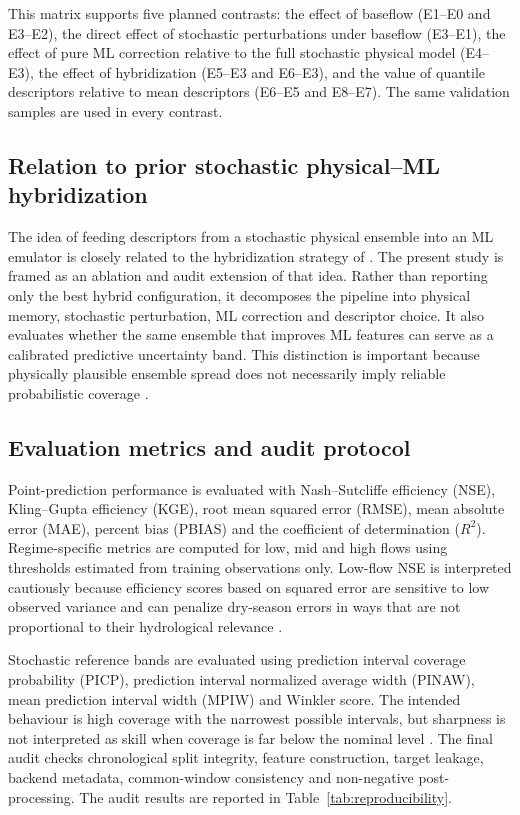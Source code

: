 This matrix supports five planned contrasts: the effect of baseflow
(E1--E0 and E3--E2), the direct effect of stochastic perturbations under
baseflow (E3--E1), the effect of pure ML correction relative to the full
stochastic physical model (E4--E3), the effect of hybridization
(E5--E3 and E6--E3), and the value of quantile descriptors relative to
mean descriptors (E6--E5 and E8--E7). The same validation samples are
used in every contrast.

\subsection{Relation to prior stochastic physical--ML hybridization}
\label{subsec:relation}

The idea of feeding descriptors from a stochastic physical ensemble into
an ML emulator is closely related to the hybridization strategy of
\citet{houenafa2025hybridization}. The present study is framed as an
ablation and audit extension of that idea. Rather than reporting only
the best hybrid configuration, it decomposes the pipeline into physical
memory, stochastic perturbation, ML correction and descriptor choice. It
also evaluates whether the same ensemble that improves ML features can
serve as a calibrated predictive uncertainty band. This distinction is
important because physically plausible ensemble spread does not
necessarily imply reliable probabilistic coverage
\citep{atger1999skill,franz2011evaluating,papacharalampous2022review}.

\subsection{Evaluation metrics and audit protocol}\label{subsec:evaluation}

Point-prediction performance is evaluated with Nash--Sutcliffe
efficiency (NSE), Kling--Gupta efficiency (KGE), root mean squared error
(RMSE), mean absolute error (MAE), percent bias (PBIAS) and the
coefficient of determination ($R^2$). Regime-specific metrics are
computed for low, mid and high flows using thresholds estimated from
training observations only. Low-flow NSE is interpreted cautiously
because efficiency scores based on squared error are sensitive to low
observed variance and can penalize dry-season errors in ways that are
not proportional to their hydrological relevance
\citep{pushpalatha2012review}.

Stochastic reference bands are evaluated using prediction interval
coverage probability (PICP), prediction interval normalized average
width (PINAW), mean prediction interval width (MPIW) and Winkler score.
The intended behaviour is high coverage with the narrowest possible
intervals, but sharpness is not interpreted as skill when coverage is
far below the nominal level \citep{franz2011evaluating,abaza2017incidence,papacharalampous2022review}.
The final audit checks chronological split integrity, feature
construction, target leakage, backend metadata, common-window
consistency and non-negative post-processing. The audit results are
reported in Table~\ref{tab:reproducibility}.

